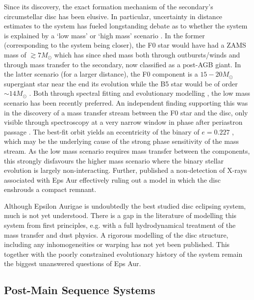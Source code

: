 \documentclass[%
 reprint,
 amsmath,amssymb,
 aps,
rmp,
floatfix,
]{revtex4-2}
\begin{document}
Since its discovery, the exact formation mechanism of the secondary's circumstellar disc has been elusive. In particular, uncertainty in distance estimates to the system has fueled longstanding debate as to whether the system is explained by a `low mass' or `high mass' scenario \citep{Lissauer1996ApJ}. In the former (corresponding to the system being closer), the F0 star would have had a ZAMS mass of $\gtrsim 7M_\odot$ which has since shed mass both through outbursts/winds and through mass transfer to the secondary, now classified as a post-AGB giant. In the latter scenario (for a larger distance), the F0 component is a $15-20M_\odot$ supergiant star near the end its evolution while the B5 star would be of order $\sim 14M_\odot$ \citep{Lambert1986PASP, Hoard2010ApJ}. Both through spectral fitting \citep{Hoard2010ApJ, Hoard2012ApJ} and evolutionary modelling \citep{Gibson2018MNRASa}, the low mass scenario has been recently preferred. An independent finding supporting this was in the discovery of a mass transfer stream between the F0 star and the disc, only visible through spectroscopy at a very narrow window in phase after periastron passage \citep{Griffin2013PASP, Gibson2018MNRASb}. The best-fit orbit yields an eccentricity of the binary of $e = 0.227$ \citep{Stefanik2010AJ}, which may be the underlying cause of the strong phase sensitivity of the mass stream. As the low mass scenario requires mass transfer between the components, this strongly disfavours the higher mass scenario where the binary stellar evolution is largely non-interacting. Further, \citet{Wolk2010AJ} published a non-detection of X-rays associated with Eps Aur effectively ruling out a model in which the disc enshrouds a compact remnant. 

Although Epsilon Aurigae is undoubtedly the best studied disc eclipsing system, much is not yet understood. There is a gap in the literature of modelling this system from first principles, e.g. with a full hydrodynamical treatment of the mass transfer and dust physics. A rigorous modelling of the disc structure, including any inhomogeneities or warping has not yet been published. This together with the poorly constrained evolutionary history of the system remain the biggest unanswered questions of Eps Aur.

\subsection{Post-Main Sequence Systems} \label{sec:postMS-disc}
\end{document}
